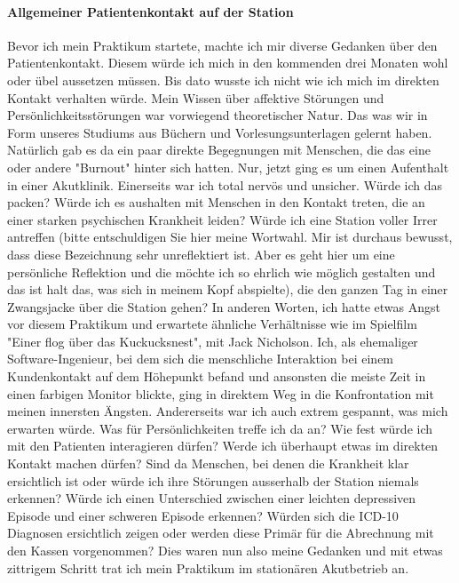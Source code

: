 \documentclass[jou,apacite]{apa6}
\begin{document}
\paragraph{Allgemeiner Patientenkontakt auf der Station}
Bevor ich mein Praktikum startete, machte ich mir diverse Gedanken über den Patientenkontakt. Diesem würde ich mich in den kommenden drei Monaten wohl oder übel aussetzen müssen. Bis dato wusste ich nicht wie ich mich im direkten Kontakt verhalten würde. Mein Wissen über affektive Störungen und Persönlichkeitsstörungen war vorwiegend theoretischer Natur. Das was wir in Form unseres Studiums aus Büchern und Vorlesungsunterlagen gelernt haben. Natürlich gab es da ein paar direkte Begegnungen mit Menschen, die das eine oder andere "Burnout" hinter sich hatten. Nur, jetzt ging es um einen Aufenthalt in einer Akutklinik. Einerseits war ich total nervös und unsicher. Würde ich das packen? Würde ich es aushalten mit Menschen in den Kontakt treten, die an einer starken psychischen Krankheit leiden? Würde ich eine Station voller Irrer antreffen (bitte entschuldigen Sie hier meine Wortwahl. Mir ist durchaus bewusst, dass diese Bezeichnung sehr unreflektiert ist. Aber es geht hier um eine persönliche Reflektion und die möchte ich so ehrlich wie möglich gestalten und das ist halt das, was sich in meinem Kopf abspielte), die den ganzen Tag in einer Zwangsjacke über die Station gehen? In anderen Worten, ich hatte etwas Angst vor diesem Praktikum und erwartete ähnliche Verhältnisse wie im Spielfilm "Einer flog über das Kuckucksnest", mit Jack Nicholson. Ich, als ehemaliger Software-Ingenieur, bei dem sich die menschliche Interaktion bei einem Kundenkontakt auf dem Höhepunkt befand und ansonsten die meiste Zeit in einen farbigen Monitor blickte, ging in direktem Weg in die Konfrontation mit meinen innersten Ängsten. Andererseits war ich auch extrem gespannt, was mich erwarten würde. Was für Persönlichkeiten treffe ich da an? Wie fest würde ich mit den Patienten interagieren dürfen? Werde ich überhaupt etwas im direkten Kontakt machen dürfen? Sind da Menschen, bei denen die Krankheit klar ersichtlich ist oder würde ich ihre Störungen ausserhalb der Station niemals erkennen? Würde ich einen Unterschied zwischen einer leichten depressiven Episode und einer schweren Episode erkennen? Würden sich die ICD-10 Diagnosen ersichtlich zeigen oder werden diese Primär für die Abrechnung mit den Kassen vorgenommen? Dies waren nun also meine Gedanken und mit etwas zittrigem Schritt trat ich mein Praktikum im stationären Akutbetrieb an.
\end{document}
